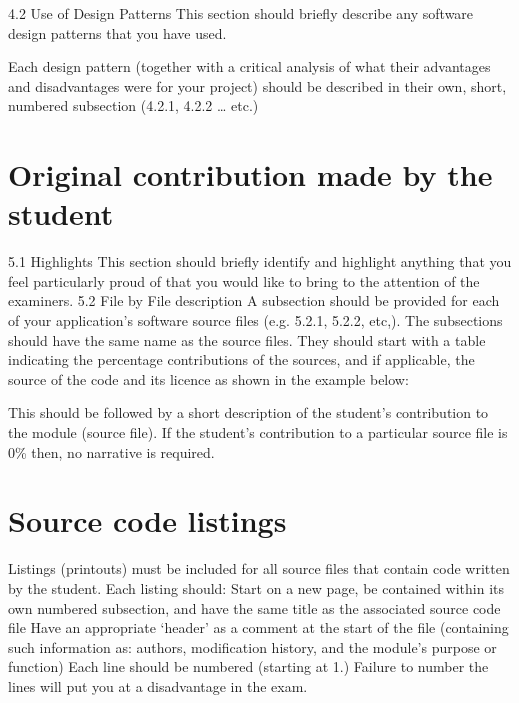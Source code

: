 \documentclass[a4paper, 11pt]{article}
\begin{document}
4.2 Use of Design Patterns
This section should briefly describe any software design patterns that you have used.

Each design pattern (together with a critical analysis of what their advantages and disadvantages were for your project) should be described in their own, short, numbered subsection (4.2.1, 4.2.2 … etc.)


\section{Original contribution made by the student}
5.1 Highlights 
This section should briefly identify and highlight anything that you feel particularly proud of that you would like to bring to the attention of the examiners. 
5.2 File by File description
A subsection should be provided for each of your application’s software source files (e.g. 5.2.1, 5.2.2, etc,). 
The subsections should have the same name as the source files.
They should start with a table indicating the percentage contributions of the sources, and if applicable, the source of the code and its licence as shown in the example below:



This should be followed by a short description of the student’s contribution to the module (source file). If the student’s contribution to a particular source file is 0\% then,  no narrative is required.


\section*{Source code listings}
Listings (printouts) must be included for all source files that contain code written by the student.
Each listing should:
Start on a new page, be contained within its own numbered subsection, and have the same title as the associated source code file
Have an appropriate ‘header’ as a comment at the start of the file (containing such information as: authors, modification history, and the module’s purpose or function)
Each line should be numbered (starting at 1.) Failure to number the lines will put you at a disadvantage in the exam.
\end{document}
